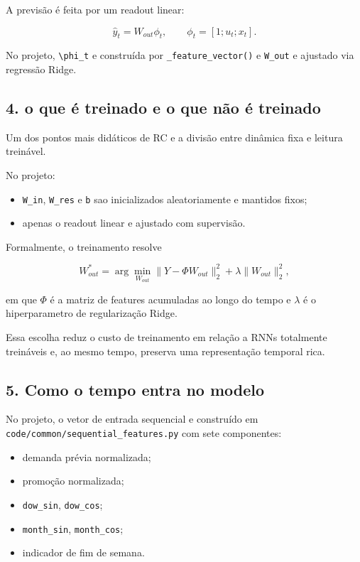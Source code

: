 \documentclass[12pt]{article}
\providecommand{\tightlist}{%
  \setlength{\itemsep}{0pt}\setlength{\parskip}{0pt}}
\begin{document}
A previsão é feita por um readout linear:

\[
\hat{y}_t = W_{out} \phi_t,
\qquad
\phi_t = [1; u_t; x_t].
\]

No projeto, \texttt{\textbackslash{}phi\_t} e construída por \texttt{\_feature\_vector()} e \texttt{W\_out} e ajustado via regressão Ridge.

\subsection{4. o que é treinado e o que não é treinado}\label{4-o-que-uxe9-treinado-e-o-que-nuxe3o-uxe9-treinado}

Um dos pontos mais didáticos de RC e a divisão entre dinâmica fixa e leitura treinável.

No projeto:

\begin{itemize}
\tightlist
\item
  \texttt{W\_in}, \texttt{W\_res} e \texttt{b} sao inicializados aleatoriamente e mantidos fixos;
\item
  apenas o readout linear e ajustado com supervisão.
\end{itemize}

Formalmente, o treinamento resolve

\[
W_{out}^* = \arg\min_{W_{out}}
\|Y - \Phi W_{out}\|_2^2 + \lambda \|W_{out}\|_2^2,
\]

em que \(\Phi\) é a matriz de features acumuladas ao longo do tempo e \(\lambda\) é o hiperparametro de regularização Ridge.

Essa escolha reduz o custo de treinamento em relação a RNNs totalmente treináveis e, ao mesmo tempo, preserva uma representação temporal rica.

\subsection{5. Como o tempo entra no modelo}\label{5-como-o-tempo-entra-no-modelo}

No projeto, o vetor de entrada sequencial e construído em \texttt{code/common/sequential\_features.py} com sete componentes:

\begin{itemize}
\tightlist
\item
  demanda prévia normalizada;
\item
  promoção normalizada;
\item
  \texttt{dow\_sin}, \texttt{dow\_cos};
\item
  \texttt{month\_sin}, \texttt{month\_cos};
\item
  indicador de fim de semana.
\end{itemize}
\end{document}
